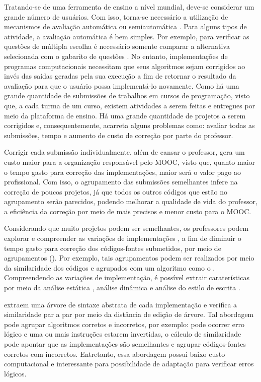 	Tratando-se de uma ferramenta de ensino a nível mundial, deve-se considerar um
	grande número de usuários. Com isso, torna-se necessário a utilização de mecanismos
	de avaliação automática ou semiautomática \cite{schmidt2013producing}. Para alguns
	tipos de atividade, a avaliação automática é bem simples. Por exemplo, para verificar
	as questões	de múltipla escolha é necessário somente comparar a alternativa selecionada
	com o gabarito de questões \cite{alario2013analysing}. No entanto, implementações de
	programas computacionais necessitam que seus algoritmos sejam corrigidos ao invés das
	saídas geradas pela sua execução a fim de retornar o resultado da avaliação para que
	o usuário possa implementá-lo novamente. Como há uma grande quantidade de submissões
	de trabalhos em	cursos de programação, visto que, a cada turma de um curso, existem
	atividades a serem feitas e entregues por meio da plataforma de ensino. Há uma grande
	quantidade de projetos a serem corrigidos e, consequentemente, acarreta alguns
	problemas como: avaliar todas as submissões, tempo e aumento de custo de correção
	por parte do professor.
	
	
	Corrigir cada submissão individualmente, além de cansar o professor, gera um custo maior
	para a organização responsável pelo MOOC, visto que, quanto maior o tempo gasto
	para correção das implementações, maior será o valor pago ao profissional. Com
	isso, o agrupamento das submissões semelhantes infere na correção de poucos
	projetos, já que todos os outros códigos que estão no agrupamento serão
	parecidos, podendo melhorar a qualidade de vida do professor, a eficiência da correção
	por meio de  mais precisos e menor custo para o MOOC.
	
	Considerando que muito projetos podem ser semelhantes, os professores podem explorar
	e compreender as variações de implementações \cite{Yin:2015}, a fim de diminuir
	o tempo gasto para correção dos códigos-fontes submetidos, por meio de agrupamentos
	(). Por exemplo, tais agrupamentos podem ser realizados por meio
	da similaridade dos códigos e agrupados com um algoritmo como o .
	Compreendendo as variações de implementação, é possível extrair caraterísticas por
	meio da análise estática \cite{Yin:2015,Glassman:2014,Taherkhani:2012}, análise
	dinâmica \cite{Glassman:2015} e análise do estilo de escrita \cite{Wei2015}.

	 extraem uma árvore de sintaxe abstrata de cada implementação
	e verifica a similaridade par a par por meio da distância de edição de árvore. Tal
	abordagem pode agrupar algoritmos corretos e incorretos, por exemplo: pode ocorrer
	erro lógico e uma ou mais instruções estarem invertidas, o cálculo de similaridade
	pode apontar que as implementações são semelhantes e agrupar códigos-fontes corretos
	com incorretos. Entretanto, essa abordagem possui baixo custo computacional e
	interessante para possibilidade de adaptação para verificar erros lógicos.
	
